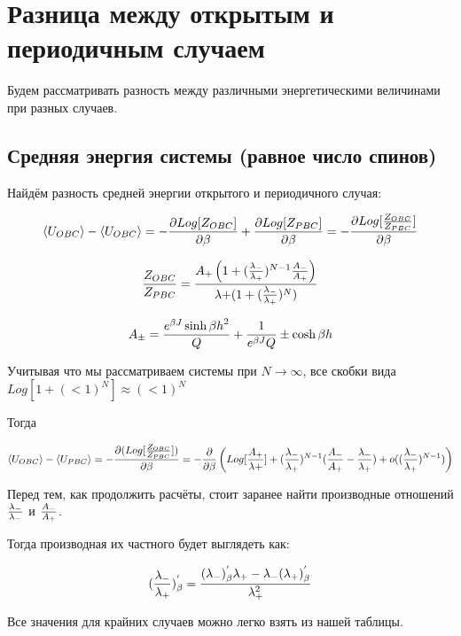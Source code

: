 \section{Разница между открытым и периодичным случаем}

Будем рассматривать разность между различными энергетическими величинами при разных случаев.

\subsection{Средняя энергия системы (равное число спинов)}


Найдём разность средней энергии открытого и периодичного случая:

\begin{equation}\label{DiffMeanE1}
    \langle U_{OBC} \rangle - \langle U_{OBC} \rangle = -\frac{\partial Log[Z_{OBC}]}{\partial \beta} + \frac{\partial Log[Z_{PBC}]}{\partial \beta} = -\frac{\partial Log[\frac{Z_{OBC}}{Z_{PBC}}]}{\partial \beta}
\end{equation}

\[ \frac{Z_{OBC}}{Z_{PBC}} = \frac{A_{+}\left( 1 + (\frac{\lambda_{-}}{\lambda_{+}})^{N - 1}  \frac{A_{-}}{A_{+}}\right)}{\lambda{+}(1 + (\frac{\lambda_{-}}{\lambda_{+}})^{N})} \]

\[ A_{\pm} = \frac{e^{\beta J} \sinh{\beta h}^2}{Q} + \frac{1}{e^{\beta J}Q} \pm \cosh{\beta h} \]

Учитывая что мы рассматриваем системы при $N \rightarrow \infty$,
все скобки вида $ Log[ 1 + (<1)^{N} ] \approx (<1)^{N} $ 

Тогда

\begin{equation}\label{diffMeanE2}
     \langle U_{OBC} \rangle - \langle U_{PBC} \rangle =  -\frac{\partial ( Log[\frac{Z_{OBC}}{Z_{PBC}}])}{\partial \beta} = -\frac{\partial}{\partial \beta} \left(Log[\frac{A_{+}}{\lambda{+}}] + (\frac{\lambda_{-}}{\lambda_{+}})^{N - 1}(\frac{A_{-}}{A_{+}} - \frac{\lambda_{-}}{\lambda_{+}}) + o((\frac{\lambda_{-}}{\lambda_{+}})^{N-1})\right)
\end{equation}

Перед тем, как продолжить расчёты, стоит заранее найти производные отношений $\frac{\lambda_{-}}{\lambda_{-}}$ и $\frac{A_{-}}{A_{+}}$. 

Тогда производная их частного будет выглядеть как:

\[ (\frac{\lambda_{-}}{\lambda_{+}})^{'}_{\beta} = \frac{(\lambda_{-})^{'}_{\beta}\lambda_{+}-\lambda_{-}(\lambda_{+})^{'}_{\beta}}{\lambda_{+}^{2}}\]

Все значения для крайних случаев можно легко взять из нашей таблицы.


